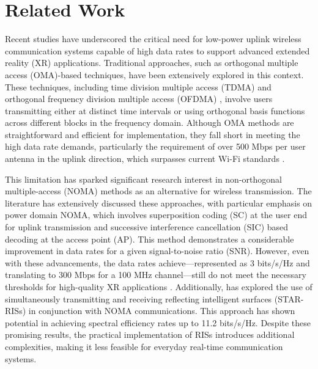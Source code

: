 \section{Related Work}

Recent studies \cite{xr1, xr2, xr3, xr4} have underscored the critical need for low-power uplink wireless communication systems capable of high data rates to support advanced extended reality (XR) applications. Traditional approaches, such as orthogonal multiple access (OMA)-based techniques, have been extensively explored in this context. These techniques, including time division multiple access (TDMA) \cite{tdma} and orthogonal frequency division multiple access (OFDMA) \cite{ofdm}, involve users transmitting either at distinct time intervals or using orthogonal basis functions across different blocks in the frequency domain. Although OMA methods are straightforward and efficient for implementation, they fall short in meeting the high data rate demands, particularly the requirement of over 500 Mbps per user antenna in the uplink direction, which surpasses current Wi-Fi standards \cite{linear1, linear2, linear3}.

This limitation has sparked significant research interest in non-orthogonal multiple-access (NOMA) methods as an alternative for wireless transmission. The literature \cite{noma1, noma2, noma3, noma4, noma5} has extensively discussed these approaches, with particular emphasis on power domain NOMA, which involves superposition coding (SC) at the user end for uplink transmission and successive interference cancellation (SIC) based decoding at the access point (AP). This method demonstrates a considerable improvement in data rates for a given signal-to-noise ratio (SNR). However, even with these advancements, the data rates achieve—represented as 3 bits/s/Hz and translating to 300 Mbps for a 100 MHz channel—still do not meet the necessary thresholds for high-quality XR applications \cite{noma1, noma2, noma3, noma4}. Additionally, \cite{noma5} has explored the use of simultaneously transmitting and receiving reflecting intelligent surfaces (STAR-RISs) in conjunction with NOMA communications. This approach has shown potential in achieving spectral efficiency rates up to 11.2 bits/s/Hz. Despite these promising results, the practical implementation of RISs introduces additional complexities, making it less feasible for everyday real-time communication systems. 



